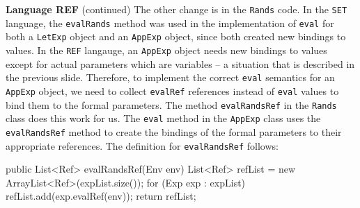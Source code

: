 \begin{minipage}[t]{\sw}
\slidenumber
\LARGE
{\bf Language REF} (continued)\exx
The other change is in the \verb'Rands' code.
In the \verb'SET' language,
the \verb'evalRands' method was used in
the implementation of \verb'eval'
for both a \verb'LetExp' object and an \verb'AppExp' object,
since both created new bindings to values.
In the \verb'REF' langauge, 
an \verb'AppExp' object needs new bindings to values
except for actual parameters which are variables --
a situation that is described in the previous slide.
Therefore, to implement the correct \verb'eval' semantics
for an \verb'AppExp' object,
we need to collect \verb'evalRef' references
instead of \verb'eval' values
to bind them to the formal parameters.
The method \verb'evalRandsRef' in the \verb'Rands' class
does this work for us.
The \verb'eval' method in the \verb'AppExp' class uses
the \verb'evalRandsRef' method
to create the bindings of the formal parameters
to their appropriate references.
The definition for \verb'evalRandsRef' follows:
{\Large
\begin{qv}
    public List<Ref> evalRandsRef(Env env) {
        List<Ref> refList = new ArrayList<Ref>(expList.size());
        for (Exp exp : expList)
            refList.add(exp.evalRef(env));
        return refList;
    }
\end{qv}
}
\end{minipage}
\clearpage
